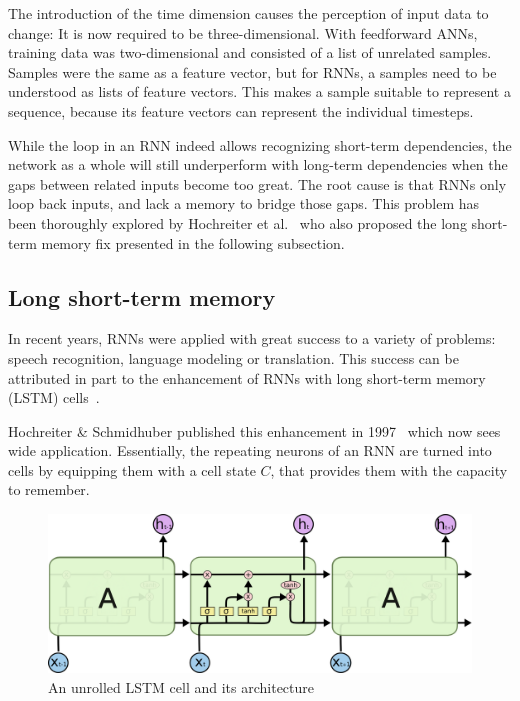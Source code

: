 The introduction of the time dimension causes the perception of input data to change: It is now required to be three-dimensional. With feedforward ANNs, training data was two-dimensional and consisted of a list of unrelated samples. Samples were the same as a feature vector, but for RNNs, a samples need to be understood as lists of feature vectors. This makes a sample suitable to represent a sequence, because its feature vectors can represent the individual timesteps.

While the loop in an RNN indeed allows recognizing short-term dependencies, the network as a whole will still underperform with long-term dependencies when the gaps between related inputs become too great. The root cause is that RNNs only loop back inputs, and lack a memory to bridge those gaps. This problem has been thoroughly explored by Hochreiter et al.~\cite{hochreiter1991untersuchungen} who also proposed the long short-term memory fix presented in the following subsection.

\subsection{Long short-term memory}\label{sec:lstm}
In recent years, RNNs were applied with great success to a variety of problems: speech recognition, language modeling or translation. This success can be attributed in part to the enhancement of RNNs with long short-term memory (LSTM) cells~\cite{jozefowicz2015empirical,kuhn2013applied,schmidhuber2015deep}.

Hochreiter \& Schmidhuber published this enhancement in 1997~\cite{hochreiter1997} which now sees wide application. Essentially, the repeating neurons of an RNN are turned into cells by equipping them with a cell state $C$, that provides them with the capacity to remember.

\begin{figure}[!htb]
    \centering
    \includegraphics[width=\textwidth]{gfx/lstm-chain.png}
    \caption{An unrolled LSTM cell and its architecture~\cite{web:colah}}
    \label{fig:lstm}
\end{figure}

